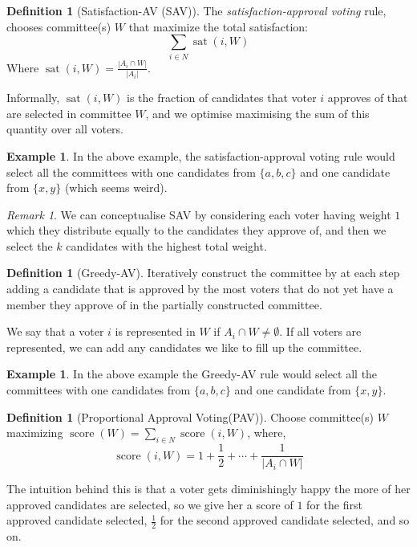 \documentclass{book}
\theoremstyle{plain}
\theoremstyle{definition}
\newtheorem{definition}[theorem]{Definition}
\newtheorem{example}[theorem]{Example}
\theoremstyle{remark}
\newtheorem{remark}[theorem]{Remark}
\begin{document}
\begin{definition}[Satisfaction-AV (SAV)]
    The \emph{satisfaction-approval voting} rule, 
    chooses committee(s) $W$ that maximize the total satisfaction:
    \[
        \sum_{i \in N} \operatorname{sat}(i, W)
    \]
    Where $\operatorname{sat}(i, W) = \frac{|A_i \cap W|}{|A_i|}$.

    Informally, $\operatorname{sat}(i, W)$
    is the fraction of candidates that voter $i$ approves of that are selected in committee $W$, and 
    we optimise maximising the sum of this quantity over all voters.
\end{definition}

\begin{example}
    In the above example,
    the satisfaction-approval voting rule would select
    all the committees with one 
    candidates from $\{a, b, c\}$ and one candidate from $\{x, y\}$
    (which seems weird).
\end{example}

\begin{remark}
    We can conceptualise 
    SAV by considering each voter having 
    weight $1$ which they distribute equally to 
    the candidates they approve of, and then we select the $k$ candidates with the 
    highest total weight.
\end{remark}

\begin{definition}[Greedy-AV]
    Iteratively construct 
    the committee by at each step adding a candidate that is approved by the 
    most voters that do not yet have a member they approve of in the partially constructed 
    committee.
    
    We say that a voter $i$ is represented in $W$ if 
    $A_i \cap W \neq \emptyset$.
    If all voters are represented, we can add any candidates we like to fill up the committee.
\end{definition}

\begin{example}
    In the above example
    the Greedy-AV rule would select all the committees with one
    candidates from $\{a, b, c\}$ and one candidate from $\{x, y\}$.
\end{example}

\begin{definition}[Proportional Approval Voting(PAV)]
    Choose committee(s) $W$ maximizing $\operatorname{score}(W) = 
    \sum_{i \in N} \operatorname{score}(i, W)$, where,
    \[
        \operatorname{score}(i, W) = 1 + \frac{1}{2} + \cdots + \frac{1}{|A_i \cap W|}
    \]

    The intuition behind this is that 
    a voter gets diminishingly happy the more of her 
    approved candidates are selected, so we give her a score of $1$ for the first approved candidate selected,
    $\frac{1}{2}$ for the second approved candidate selected, and so on.
\end{definition}
\end{document}

